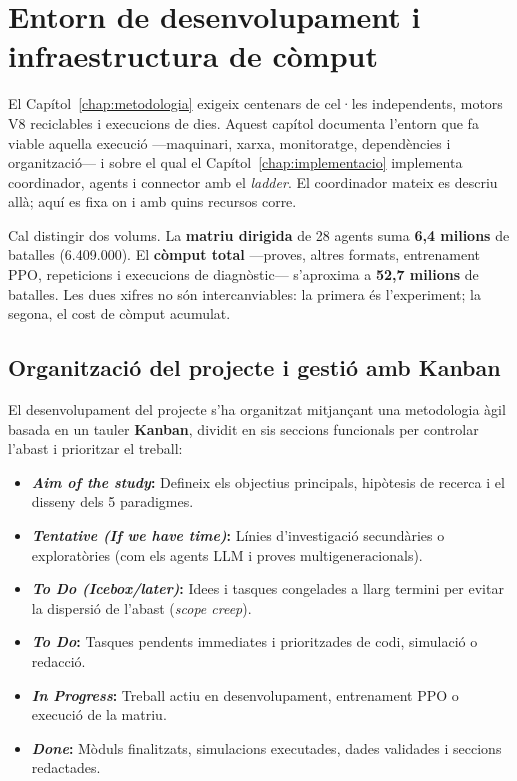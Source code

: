 \chapter{Entorn de desenvolupament i infraestructura de còmput}
\label{chap:infraestructura}

El Capítol~\ref{chap:metodologia} exigeix centenars de cel·les independents, motors V8 reciclables i execucions de dies. Aquest capítol documenta l'entorn que fa viable aquella execució ---maquinari, xarxa, monitoratge, dependències i organització--- i sobre el qual el Capítol~\ref{chap:implementacio} implementa coordinador, agents i connector amb el \emph{ladder}. El coordinador mateix es descriu allà; aquí es fixa on i amb quins recursos corre.

Cal distingir dos volums. La \textbf{matriu dirigida} de 28 agents suma \textbf{6,4 milions} de batalles (6.409.000). El \textbf{còmput total} ---proves, altres formats, entrenament PPO, repeticions i execucions de diagnòstic--- s'aproxima a \textbf{52,7 milions} de batalles. Les dues xifres no són intercanviables: la primera és l'experiment; la segona, el cost de còmput acumulat.

\section{Organització del projecte i gestió amb Kanban}
\label{sec:kanban}

El desenvolupament del projecte s'ha organitzat mitjançant una metodologia àgil basada en un tauler \textbf{Kanban}, dividit en sis seccions funcionals per controlar l'abast i prioritzar el treball:

\begin{itemize}
    \item \textbf{\textit{Aim of the study}:} Defineix els objectius principals, hipòtesis de recerca i el disseny dels 5 paradigmes.
    \item \textbf{\textit{Tentative (If we have time)}:} Línies d'investigació secundàries o exploratòries (com els agents LLM i proves multigeneracionals).
    \item \textbf{\textit{To Do (Icebox/later)}:} Idees i tasques congelades a llarg termini per evitar la dispersió de l'abast (\textit{scope creep}).
    \item \textbf{\textit{To Do}:} Tasques pendents immediates i prioritzades de codi, simulació o redacció.
    \item \textbf{\textit{In Progress}:} Treball actiu en desenvolupament, entrenament PPO o execució de la matriu.
    \item \textbf{\textit{Done}:} Mòduls finalitzats, simulacions executades, dades validades i seccions redactades.
\end{itemize}


